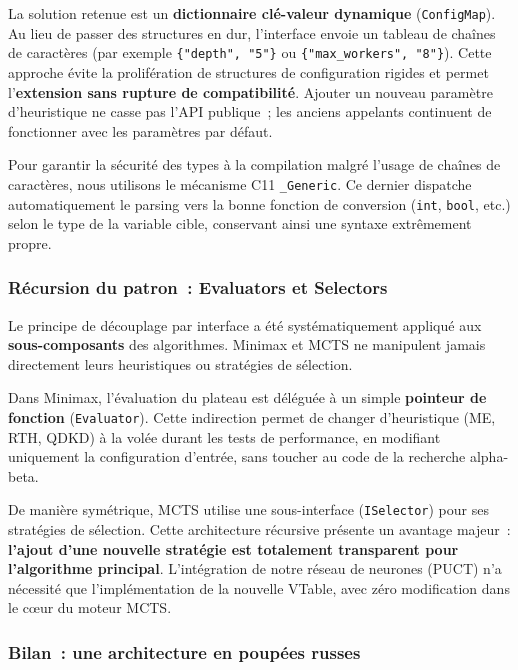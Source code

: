 \documentclass[a4paper]{article}
\begin{document}
La solution retenue est un \textbf{dictionnaire clé-valeur dynamique} (\texttt{ConfigMap}). Au lieu de passer des structures en dur, l'interface envoie un tableau de chaînes de caractères (par exemple \texttt{\{"depth", "5"\}} ou \texttt{\{"max\_workers", "8"\}}). Cette approche évite la prolifération de structures de configuration rigides et permet l'\textbf{extension sans rupture de compatibilité}. Ajouter un nouveau paramètre d'heuristique ne casse pas l'API publique~; les anciens appelants continuent de fonctionner avec les paramètres par défaut.

Pour garantir la sécurité des types à la compilation malgré l'usage de chaînes de caractères, nous utilisons le mécanisme C11 \texttt{\_Generic}. Ce dernier dispatche automatiquement le parsing vers la bonne fonction de conversion (\texttt{int}, \texttt{bool}, etc.) selon le type de la variable cible, conservant ainsi une syntaxe extrêmement propre.

\subsubsection{Récursion du patron~: Evaluators et Selectors}

Le principe de découplage par interface a été systématiquement appliqué aux \textbf{sous-composants} des algorithmes. Minimax et MCTS ne manipulent jamais directement leurs heuristiques ou stratégies de sélection.

Dans Minimax, l'évaluation du plateau est déléguée à un simple \textbf{pointeur de fonction} (\texttt{Evaluator}). Cette indirection permet de changer d'heuristique (ME, RTH, QDKD) à la volée durant les tests de performance, en modifiant uniquement la configuration d'entrée, sans toucher au code de la recherche alpha-beta.

De manière symétrique, MCTS utilise une sous-interface (\texttt{ISelector}) pour ses stratégies de sélection. Cette architecture récursive présente un avantage majeur~: \textbf{l'ajout d'une nouvelle stratégie est totalement transparent pour l'algorithme principal}. L'intégration de notre réseau de neurones (PUCT) n'a nécessité que l'implémentation de la nouvelle VTable, avec zéro modification dans le cœur du moteur MCTS.

\subsubsection{Bilan~: une architecture en poupées russes}
\end{document}
